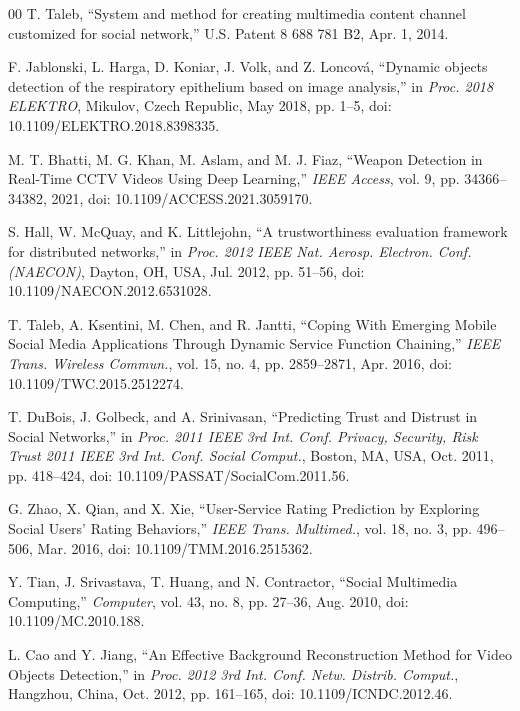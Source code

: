 \documentclass[conference]{IEEEtran}
\begin{document}
\begin{thebibliography}{00}
 T. Taleb, ``System and method for creating multimedia content channel customized for social network,'' U.S. Patent 8 688 781 B2, Apr. 1, 2014.

 F. Jablonski, L. Harga, D. Koniar, J. Volk, and Z. Loncová, ``Dynamic objects detection of the respiratory epithelium based on image analysis,'' in \emph{Proc. 2018 ELEKTRO}, Mikulov, Czech Republic, May 2018, pp. 1--5, doi: 10.1109/ELEKTRO.2018.8398335.

 M. T. Bhatti, M. G. Khan, M. Aslam, and M. J. Fiaz, ``Weapon Detection in Real-Time CCTV Videos Using Deep Learning,'' \emph{IEEE Access}, vol. 9, pp. 34366--34382, 2021, doi: 10.1109/ACCESS.2021.3059170.

 S. Hall, W. McQuay, and K. Littlejohn, ``A trustworthiness evaluation framework for distributed networks,'' in \emph{Proc. 2012 IEEE Nat. Aerosp. Electron. Conf. (NAECON)}, Dayton, OH, USA, Jul. 2012, pp. 51--56, doi: 10.1109/NAECON.2012.6531028.

 T. Taleb, A. Ksentini, M. Chen, and R. Jantti, ``Coping With Emerging Mobile Social Media Applications Through Dynamic Service Function Chaining,'' \emph{IEEE Trans. Wireless Commun.}, vol. 15, no. 4, pp. 2859--2871, Apr. 2016, doi: 10.1109/TWC.2015.2512274.

 T. DuBois, J. Golbeck, and A. Srinivasan, ``Predicting Trust and Distrust in Social Networks,'' in \emph{Proc. 2011 IEEE 3rd Int. Conf. Privacy, Security, Risk Trust 2011 IEEE 3rd Int. Conf. Social Comput.}, Boston, MA, USA, Oct. 2011, pp. 418--424, doi: 10.1109/PASSAT/SocialCom.2011.56.

 G. Zhao, X. Qian, and X. Xie, ``User-Service Rating Prediction by Exploring Social Users' Rating Behaviors,'' \emph{IEEE Trans. Multimed.}, vol. 18, no. 3, pp. 496--506, Mar. 2016, doi: 10.1109/TMM.2016.2515362.

 Y. Tian, J. Srivastava, T. Huang, and N. Contractor, ``Social Multimedia Computing,'' \emph{Computer}, vol. 43, no. 8, pp. 27--36, Aug. 2010, doi: 10.1109/MC.2010.188.

 L. Cao and Y. Jiang, ``An Effective Background Reconstruction Method for Video Objects Detection,'' in \emph{Proc. 2012 3rd Int. Conf. Netw. Distrib. Comput.}, Hangzhou, China, Oct. 2012, pp. 161--165, doi: 10.1109/ICNDC.2012.46.


\end{thebibliography}
\end{document}
